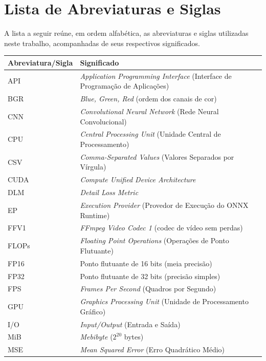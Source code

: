 \documentclass[
    12pt,                %
    openright,           %
    oneside,             %
    a4paper,             %
    english,             %
    brazil               %
]{abntex2}
\begin{document}
\chapter*{Lista de Abreviaturas e Siglas}

\noindent A lista a seguir reúne, em ordem alfabética, as abreviaturas e siglas utilizadas neste trabalho, acompanhadas de seus respectivos significados.

\vspace{\onelineskip}

\begin{table}[htb]
\centering
\begin{tabularx}{\textwidth}{@{}p{5.0cm}Y@{}}
\toprule
\textbf{Abreviatura/Sigla} & \textbf{Significado} \\
\midrule
API   & \textit{Application Programming Interface} (Interface de Programação de Aplicações) \\
BGR   & \textit{Blue, Green, Red} (ordem dos canais de cor) \\
CNN   & \textit{Convolutional Neural Network} (Rede Neural Convolucional) \\
CPU   & \textit{Central Processing Unit} (Unidade Central de Processamento) \\
CSV   & \textit{Comma-Separated Values} (Valores Separados por Vírgula) \\
CUDA  & \textit{Compute Unified Device Architecture} \\
DLM   & \textit{Detail Loss Metric} \\
EP    & \textit{Execution Provider} (Provedor de Execução do ONNX Runtime) \\
FFV1  & \textit{FFmpeg Video Codec 1} (codec de vídeo sem perdas) \\
FLOPs & \textit{Floating Point Operations} (Operações de Ponto Flutuante) \\
FP16  & Ponto flutuante de 16 bits (meia precisão) \\
FP32  & Ponto flutuante de 32 bits (precisão simples) \\
FPS   & \textit{Frames Per Second} (Quadros por Segundo) \\
GPU   & \textit{Graphics Processing Unit} (Unidade de Processamento Gráfico) \\
I/O   & \textit{Input/Output} (Entrada e Saída) \\
MiB   & \textit{Mebibyte} ($2^{20}$ bytes) \\
MSE  & \textit{Mean Squared Error} (Erro Quadrático Médio) \\

\end{tabularx}
\end{table}
\end{document}
